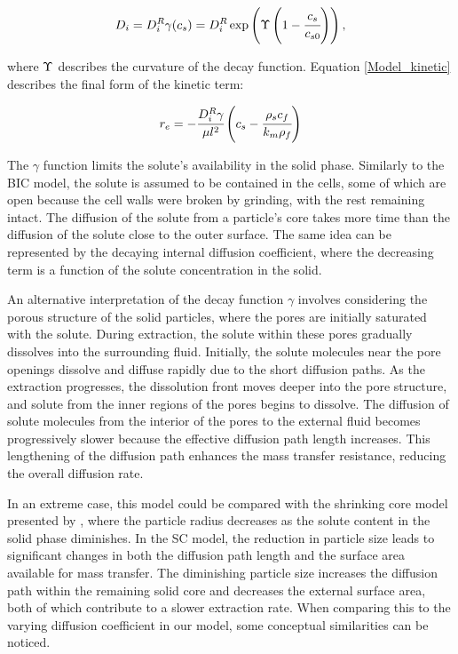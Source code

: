 \documentclass[a4paper,fleqn]{cas-dc}
\begin{document}
	{\footnotesize
		\begin{equation}
			D_i = D_i^R \gamma(c_s) = D_i^R \exp \left( \Upsilon \left( 1-\cfrac{ c_s }{c_{s0}} \right) \right), \label{EQ: C_sat_function}
	\end{equation} }
	
	where  ${\color{black}\Upsilon}$ describes the curvature of the decay function. Equation \ref{Model_kinetic} describes the final form of the kinetic term:
	
	{\footnotesize
		\begin{equation}
			\label{Model_kinetic}
			r_e = -\cfrac{D_i^R \gamma }{ \mu l^2 } \left( c_s  - \cfrac{\rho_s c_f }{ k_m \rho_f }  \right)
	\end{equation} }
	
	The $\gamma$ function limits the solute's availability in the solid phase. Similarly to the BIC model, the solute is assumed to be contained in the cells, some of which are open because the cell walls were broken by grinding, with the rest remaining intact. The diffusion of the solute from a particle's core takes more time than the diffusion of the solute close to the outer surface. The same idea can be represented by the decaying internal diffusion coefficient, where the decreasing term is a function of the solute concentration in the solid. 
	
	An alternative interpretation of the decay function $\gamma$ involves considering the porous structure of the solid particles, where the pores are initially saturated with the solute. During extraction, the solute within these pores gradually dissolves into the surrounding fluid. Initially, the solute molecules near the pore openings dissolve and diffuse rapidly due to the short diffusion paths. As the extraction progresses, the dissolution front moves deeper into the pore structure, and solute from the inner regions of the pores begins to dissolve. The diffusion of solute molecules from the interior of the pores to the external fluid becomes progressively slower because the effective diffusion path length increases. This lengthening of the diffusion path enhances the mass transfer resistance, reducing the overall diffusion rate. 
	
	In an extreme case, this model could be compared with the shrinking core model presented by \citet{Goto1996}, where the particle radius decreases as the solute content in the solid phase diminishes. In the SC model, the reduction in particle size leads to significant changes in both the diffusion path length and the surface area available for mass transfer. The diminishing particle size increases the diffusion path within the remaining solid core and decreases the external surface area, both of which contribute to a slower extraction rate. When comparing this to the varying diffusion coefficient in our model, some conceptual similarities can be noticed.
	
\end{document}

